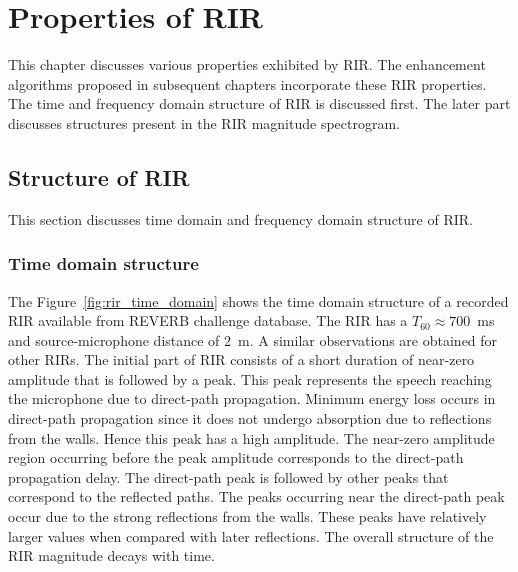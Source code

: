 \chapter{Properties of RIR}
\label{chapter:rir}
This chapter discusses various properties exhibited by RIR. The enhancement algorithms proposed in subsequent chapters incorporate these RIR properties. The time and frequency domain structure of RIR is discussed first. The later part discusses structures present in the RIR magnitude spectrogram. 

\section{Structure of RIR}
This section discusses time domain and frequency domain structure of RIR. 

\subsection{Time domain structure}
The Figure~\ref{fig:rir_time_domain} shows the time domain structure of a recorded RIR available from REVERB challenge database. The RIR has a $T_{60}\approx 700$~ms and source-microphone distance of $2$~m. A similar observations are obtained for other RIRs. The initial part of RIR consists of a short duration of near-zero amplitude that is followed by a peak. This peak represents the speech reaching the microphone due to direct-path propagation. Minimum energy loss occurs in direct-path propagation since it does not undergo absorption due to reflections from the walls. Hence this peak has a high amplitude. The near-zero amplitude region occurring before the peak amplitude corresponds to the direct-path propagation delay. The direct-path peak is followed by other peaks that correspond to the reflected paths. The peaks occurring near the direct-path peak occur due to the strong reflections from the walls. These peaks have relatively larger values when compared with later reflections. The overall structure of the RIR magnitude decays with time.  


